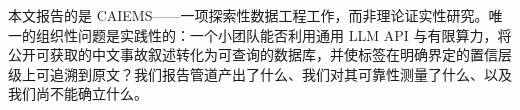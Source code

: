 \documentclass[11pt]{article}
\begin{document}
{\cjkfont 本\allowbreak 文\allowbreak 报\allowbreak 告\allowbreak 的\allowbreak 是} CAIEMS------{\cjkfont 一\allowbreak 项\allowbreak 探\allowbreak 索\allowbreak 性\allowbreak 数\allowbreak 据\allowbreak 工\allowbreak 程\allowbreak 工\allowbreak 作\allowbreak ，\allowbreak 而\allowbreak 非\allowbreak 理\allowbreak 论\allowbreak 证\allowbreak 实\allowbreak 性\allowbreak 研\allowbreak 究\allowbreak 。\allowbreak 唯\allowbreak 一\allowbreak 的\allowbreak 组\allowbreak 织\allowbreak 性\allowbreak 问\allowbreak 题\allowbreak 是\allowbreak 实\allowbreak 践\allowbreak 性\allowbreak 的\allowbreak ：\allowbreak 一\allowbreak 个\allowbreak 小\allowbreak 团\allowbreak 队\allowbreak 能\allowbreak 否\allowbreak 利\allowbreak 用\allowbreak 通\allowbreak 用} LLM API {\cjkfont 与\allowbreak 有\allowbreak 限\allowbreak 算\allowbreak 力\allowbreak ，\allowbreak 将\allowbreak 公\allowbreak 开\allowbreak 可\allowbreak 获\allowbreak 取\allowbreak 的\allowbreak 中\allowbreak 文\allowbreak 事\allowbreak 故\allowbreak 叙\allowbreak 述\allowbreak 转\allowbreak 化\allowbreak 为\allowbreak 可\allowbreak 查\allowbreak 询\allowbreak 的\allowbreak 数\allowbreak 据\allowbreak 库\allowbreak ，\allowbreak 并\allowbreak 使\allowbreak 标\allowbreak 签\allowbreak 在\allowbreak 明\allowbreak 确\allowbreak 界\allowbreak 定\allowbreak 的\allowbreak 置\allowbreak 信\allowbreak 层\allowbreak 级\allowbreak 上\allowbreak 可\allowbreak 追\allowbreak 溯\allowbreak 到\allowbreak 原\allowbreak 文\allowbreak ？\allowbreak 我\allowbreak 们\allowbreak 报\allowbreak 告\allowbreak 管\allowbreak 道\allowbreak 产\allowbreak 出\allowbreak 了\allowbreak 什\allowbreak 么\allowbreak 、\allowbreak 我\allowbreak 们\allowbreak 对\allowbreak 其\allowbreak 可\allowbreak 靠\allowbreak 性\allowbreak 测\allowbreak 量\allowbreak 了\allowbreak 什\allowbreak 么\allowbreak 、\allowbreak 以\allowbreak 及\allowbreak 我\allowbreak 们\allowbreak 尚\allowbreak 不\allowbreak 能\allowbreak 确\allowbreak 立\allowbreak 什\allowbreak 么\allowbreak 。}
\end{document}
